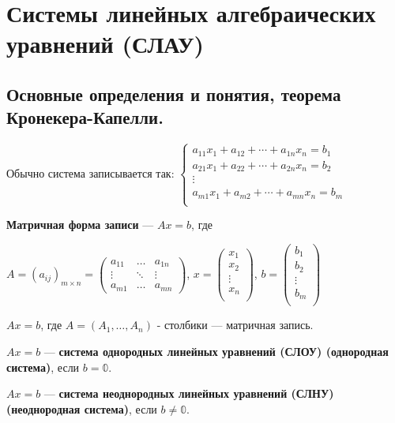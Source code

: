 \section{Системы линейных алгебраических уравнений (СЛАУ)}
\subsection{Основные определения и понятия, теорема Кронекера-Капелли.}
Обычно система записывается так:
\(\begin{cases}
    a_{11}x_1 + a_{12} + \cdots + a_{1n} x_n = b_1 \\

    a_{21}x_1 + a_{22} + \cdots + a_{2n} x_n = b_2 \\

    \vdots                                         \\

    a_{m1}x_1 + a_{m2} + \cdots + a_{mn} x_n = b_m \\
\end{cases}\)

\textbf{Матричная форма записи} --- \(Ax = b\), где

\(A = (a_{ij})_{m\times n} =
\begin{pmatrix}
    a_{11} & \ldots & a_{1n} \\
    \vdots & \ddots & \vdots \\
    a_{m1} & \ldots & a_{mn}
\end{pmatrix}\),
\(x = \begin{pmatrix}
    x_1 \\
    x_2 \\ \vdots \\ x_n \\
\end{pmatrix}\),
\(b = \begin{pmatrix}
    b_1 \\
    b_2 \\ \vdots \\ b_m \\
\end{pmatrix}\)

\(Ax = b\), где \(A = (A_1, \ldots, A_n)\) - столбики --- матричная запись.


\(Ax = b\) --- \textbf{система однородных линейных уравнений (СЛОУ) (однородная система)}, если \(b = \mathbb{0}\).

\(Ax = b\) --- \textbf{система неоднородных линейных уравнений (СЛНУ) (неоднородная система)}, если \(b \neq \mathbb{0}\).

